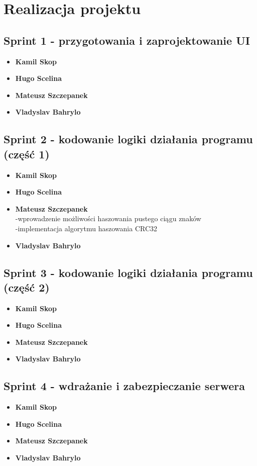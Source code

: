 \documentclass[12pt,a4paper]{article}
\begin{document}
\newpage
\section{Realizacja projektu}
	\subsection{Sprint 1 - przygotowania i zaprojektowanie UI}
		\begin{itemize}
			\item{\textbf{Kamil Skop}}
			\item{\textbf{Hugo Scelina}}
			\item{\textbf{Mateusz Szczepanek}}
			\item{\textbf{Vladyslav Bahrylo}}
		\end{itemize}
    \subsection{Sprint 2 - kodowanie logiki działania programu (część 1)}
    	\begin{itemize}
    		\item{\textbf{Kamil Skop}}
    		\item{\textbf{Hugo Scelina}}
    		\item{\textbf{Mateusz Szczepanek}}\\
    			-wprowadzenie możliwości haszowania pustego ciągu znaków\\
    			-implementacja algorytmu haszowania CRC32
    		\item{\textbf{Vladyslav Bahrylo}}
    	\end{itemize}
    \subsection{Sprint 3 - kodowanie logiki działania programu (część 2)}
    	\begin{itemize}
    		\item{\textbf{Kamil Skop}}
    		\item{\textbf{Hugo Scelina}}
    		\item{\textbf{Mateusz Szczepanek}}
    		\item{\textbf{Vladyslav Bahrylo}}
    	\end{itemize}
    \subsection{Sprint 4 - wdrażanie i zabezpieczanie serwera}
    	\begin{itemize}
    		\item{\textbf{Kamil Skop}}
    		\item{\textbf{Hugo Scelina}}
    		\item{\textbf{Mateusz Szczepanek}}
    		\item{\textbf{Vladyslav Bahrylo}}
    	\end{itemize}
\end{document}
